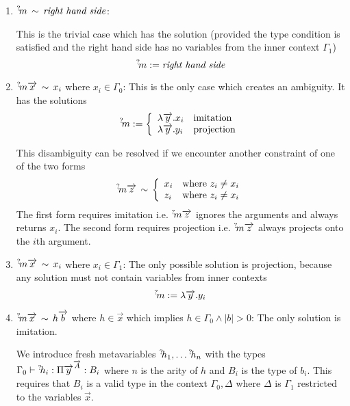 \begin{enumerate}

    \item ${{}^? \kern-0.2em m} \,\sim\, \text{\emph{right hand side}}$:

        This is the trivial case which has the solution
        (provided the type
        condition is satisfied and the right hand side has no variables from the
        inner context $\Gamma_1$)
        $$
            {{}^? \kern-0.2em m} := \text{\emph{right hand side}}
        $$


    \item ${{}^? \kern-0.2em m} {\overrightarrow {x}} \,\sim\, x_i$ where $x_i \in \Gamma_0$:
        This is the
        only case which creates an ambiguity. It has the solutions
        $$
            {{}^? \kern-0.2em m} := \left\{ \begin{array}{lllll} 
                \lambda {\overrightarrow {y}}. x_i & \text{imitation}
                \\
                \lambda {\overrightarrow {y}}. y_i & \text{projection}
             \end{array} \right.
        $$

        This disambiguity can be resolved if we encounter another constraint of
        one of the two forms
        $$
            {{}^? \kern-0.2em m} {\overrightarrow {z}} \,\sim\,
            \left\{ \begin{array}{lllll} 
                x_i &\text{where } z_i \ne x_i
                \\
                z_i &\text{where } z_i \ne x_i
             \end{array} \right.
        $$
        The first form requires imitation i.e. ${{}^? \kern-0.2em m} {\overrightarrow {z}}$ ignores the
        arguments and always returns $x_i$. The second form requires projection
        i.e. ${{}^? \kern-0.2em m} {\overrightarrow {z}}$ always projects onto the $i$th argument.


    \item ${{}^? \kern-0.2em m} {\overrightarrow {x}} \,\sim\, x_i$ where $x_i \in \Gamma_1$: The only
        possible solution is projection, because any solution must not contain
        variables from inner contexts
        $$
            {{}^? \kern-0.2em m} := \lambda {\overrightarrow {y}} . y_i
        $$


    \item ${{}^? \kern-0.2em m} {\overrightarrow {x}} \,\sim\, h {\overrightarrow {b}}$ where $h \in \vec x$ which implies
        $h \in
        \Gamma_0 \land |b| > 0$:
        The only solution is imitation.

        We introduce fresh metavariables ${{}^? \kern-0.2em h}_1, \ldots {{}^? \kern-0.2em h}_n$ with the
        types $\Gamma_0 \vdash {{}^? \kern-0.2em h}_i : \Pi {\overrightarrow {y}}^{{\overrightarrow {A}}} : B_i$ where $n$
        is the arity of $h$ and $B_i$ is the type of $b_i$. This requires that
        $B_i$ is a valid type in the context $\Gamma_0, \Delta$ where $\Delta$
        is $\Gamma_1$ restricted to the variables $\vec x$.


\end{enumerate}
